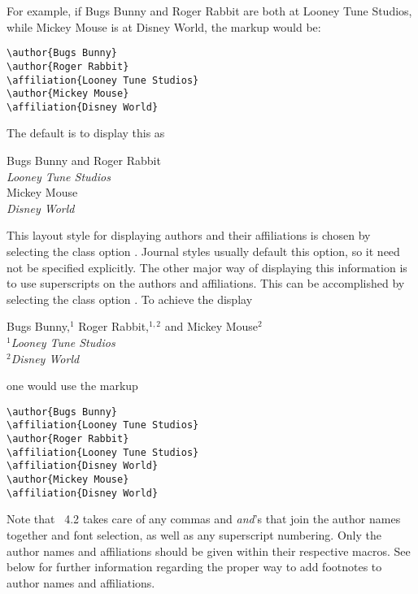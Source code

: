 \documentclass[%
,aps%
 ,twocolumn%
 ,secnumarabic%
,amssymb, amsmath,nobibnotes, aps, prl, floatfix]{revtex4-2}
\begin{document}
For example, if Bugs Bunny and Roger Rabbit are both at Looney Tune
Studios, while Mickey Mouse is at Disney World, the markup would be:
\begin{verbatim}
\author{Bugs Bunny}
\author{Roger Rabbit}
\affiliation{Looney Tune Studios}
\author{Mickey Mouse}
\affiliation{Disney World}
\end{verbatim}
The default is to display this as 
\begin{center}
Bugs Bunny and Roger Rabbit\\
\emph{Looney Tune Studios}\\
Mickey Mouse\\
\emph{Disney World}\\
\end{center}
This layout style for displaying authors and their affiliations is
chosen by selecting the class option
. Journal styles usually default this option,
 so it need not be specified explicitly. The other major way of displaying this
information is to use superscripts on the authors and
affiliations. This can be accomplished by selecting the class option
. To achieve the display
\begin{center}
Bugs Bunny,$^{1}$ Roger Rabbit,$^{1,2}$ and Mickey Mouse$^{2}$\\
\emph{$^{1}$Looney Tune Studios}\\
\emph{$^{2}$Disney World}\\
\end{center}
one would use the markup
\begin{verbatim}
\author{Bugs Bunny}
\affiliation{Looney Tune Studios}
\author{Roger Rabbit}
\affiliation{Looney Tune Studios}
\affiliation{Disney World}
\author{Mickey Mouse}
\affiliation{Disney World}
\end{verbatim}

Note that \revtex~4.2 takes care of any commas and \emph{and}'s that join
the author names together and font selection, as well as any
superscript numbering. Only the author names and affiliations should
be given within their respective macros. See below for further information
regarding the proper way to add footnotes to author names and affiliations.
\end{document}
